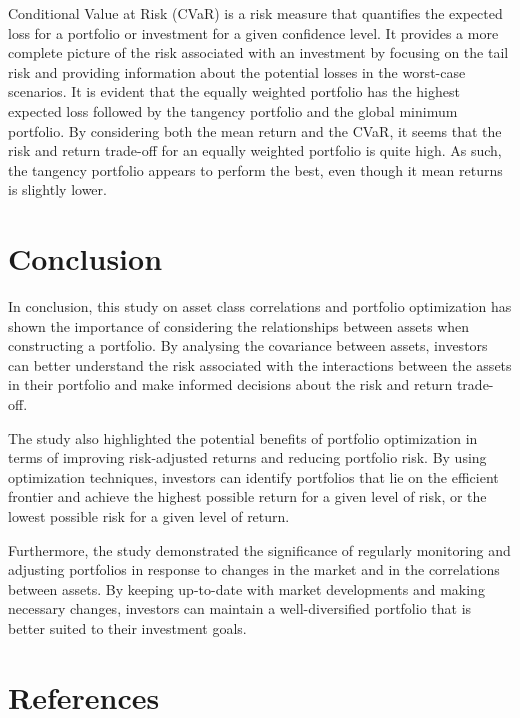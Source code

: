 \documentclass[11pt,preprint, authoryear]{elsarticle}
\numberwithin{equation}{section}
\numberwithin{figure}{section}
\numberwithin{table}{section}
\begin{document}
Conditional Value at Risk (CVaR) is a risk measure that quantifies the
expected loss for a portfolio or investment for a given confidence
level. It provides a more complete picture of the risk associated with
an investment by focusing on the tail risk and providing information
about the potential losses in the worst-case scenarios. It is evident
that the equally weighted portfolio has the highest expected loss
followed by the tangency portfolio and the global minimum portfolio. By
considering both the mean return and the CVaR, it seems that the risk
and return trade-off for an equally weighted portfolio is quite high. As
such, the tangency portfolio appears to perform the best, even though it
mean returns is slightly lower.

\hypertarget{conclusion}{%
\section{Conclusion}\label{conclusion}}

In conclusion, this study on asset class correlations and portfolio
optimization has shown the importance of considering the relationships
between assets when constructing a portfolio. By analysing the
covariance between assets, investors can better understand the risk
associated with the interactions between the assets in their portfolio
and make informed decisions about the risk and return trade-off.

The study also highlighted the potential benefits of portfolio
optimization in terms of improving risk-adjusted returns and reducing
portfolio risk. By using optimization techniques, investors can identify
portfolios that lie on the efficient frontier and achieve the highest
possible return for a given level of risk, or the lowest possible risk
for a given level of return.

Furthermore, the study demonstrated the significance of regularly
monitoring and adjusting portfolios in response to changes in the market
and in the correlations between assets. By keeping up-to-date with
market developments and making necessary changes, investors can maintain
a well-diversified portfolio that is better suited to their investment
goals.

\newpage

\hypertarget{references}{%
\section*{References}\label{references}}
\end{document}
